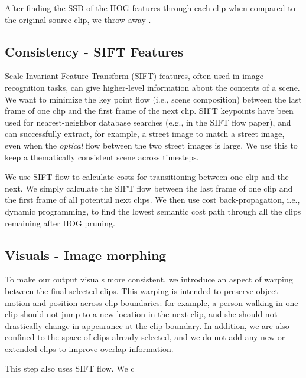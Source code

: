 After finding the SSD of the HOG features through each clip when compared to the original source clip, we throw away .

\subsection{Consistency - SIFT Features}

Scale-Invariant Feature Transform (SIFT) features, often used in image recognition tasks, can give higher-level information about the contents of a scene.  We want to minimize the key point flow (i.e., scene composition) between the last frame of one clip and the first frame of the next clip.  SIFT keypoints have been used for nearest-neighbor database searches (e.g., in the SIFT flow paper), and can successfully extract, for example, a street image to match a street image, even when the \emph{optical} flow between the two street images is large.  We use this to keep a thematically consistent scene across timesteps.

We use SIFT flow to calculate costs for transitioning between one clip and the next.  We simply calculate the SIFT flow between the last frame of one clip and the first frame of all potential next clips.  We then use cost back-propagation, i.e., dynamic programming, to find the lowest semantic cost path through all the clips remaining after HOG pruning.

\subsection{Visuals - Image morphing}

To make our output visuals more consistent, we introduce an aspect of warping between the final selected clips.  This warping is intended to preserve object motion and position across clip boundaries: for example, a person walking in one clip should not jump to a new location in the next clip, and she should not drastically change in appearance at the clip boundary.  In addition, we are also confined to the space of clips already selected, and we do not add any new or extended clips to improve overlap information.

This step also uses SIFT flow.  We c